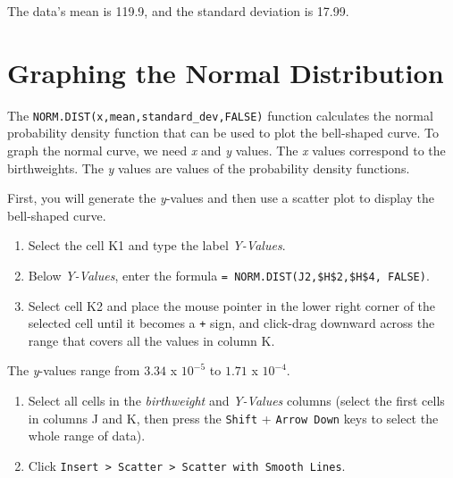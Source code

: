 \documentclass[
  12pt,
  letterpaper,
]{book}
\providecommand{\tightlist}{%
  \setlength{\itemsep}{0pt}\setlength{\parskip}{0pt}}
\begin{document}
The data's mean is 119.9, and the standard deviation is 17.99.

\hypertarget{graphing-the-normal-distribution}{%
\section{Graphing the Normal Distribution}\label{graphing-the-normal-distribution}}

The \texttt{NORM.DIST(x,mean,standard\_dev,FALSE)} function calculates the normal probability density function that can be used to plot the bell-shaped curve. To graph the normal curve, we need \emph{x} and \emph{y} values. The \emph{x} values correspond to the birthweights. The \emph{y} values are values of the probability density functions.

First, you will generate the \emph{y}-values and then use a scatter plot to display the bell-shaped curve.

\begin{enumerate}
\def\labelenumi{\arabic{enumi}.}
\tightlist
\item
  Select the cell K1 and type the label \emph{Y-Values}.
\item
  Below \emph{Y-Values}, enter the formula \texttt{=\ NORM.DIST(J2,\$H\$2,\$H\$4,\ FALSE)}.
\item
  Select cell K2 and place the mouse pointer in the lower right corner of the selected cell until it becomes a \texttt{+} sign, and click-drag downward across the range that covers all the values in column K.
\end{enumerate}

The \emph{y}-values range from \(3.34\) x \(10^{-5}\) to \(1.71\) x \(10^{-4}\).

\begin{enumerate}
\def\labelenumi{\arabic{enumi}.}
\setcounter{enumi}{3}
\tightlist
\item
  Select all cells in the \emph{birthweight} and \emph{Y-Values} columns (select the first cells in columns J and K, then press the \texttt{Shift} + \texttt{Arrow\ Down} keys to select the whole range of data).
\item
  Click \texttt{Insert\ \textgreater{}\ Scatter\ \textgreater{}\ Scatter\ with\ Smooth\ Lines}.
\end{enumerate}
\end{document}
